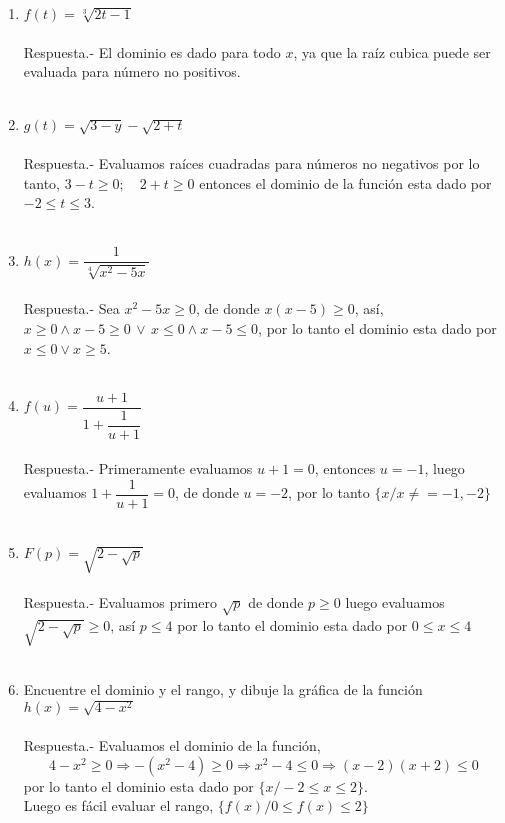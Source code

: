 \begin{enumerate}
    \item $f(t)=\sqrt[3]{2t-1}$ \\\\
	Respuesta.-\: El dominio es dado para todo $x$, ya que la raíz cubica puede ser evaluada para número no positivos.\\\\

    \item $g(t)=\sqrt{3-y}-\sqrt{2+t}$ \\\\
	Respuesta.-\: Evaluamos raíces cuadradas para números no negativos por lo tanto, $3-t\geq 0; \quad 2+t\geq 0$ entonces el dominio de la función esta dado por  $-2\leq t\leq 3$.\\\\

    \item $h(x)=\dfrac{1}{\sqrt[4]{x^2-5x}}$ \\\\
	Respuesta.-\: Sea $x^2-5x \geq 0$, de donde $x(x-5)\geq 0$, así, $x\geq 0 \land x-5\geq 0 \, \lor \, x\leq 0 \land x-5\leq 0$, por lo tanto el dominio esta dado por $x\leq 0 \lor x\geq 5$.\\\\ 

    \item $f(u)=\dfrac{u+1}{1+\dfrac{1}{u+1}}$ \\\\
	Respuesta.-\: Primeramente evaluamos $u+1=0$, entonces $u=-1$, luego evaluamos $1+\dfrac{1}{u+1}=0$, de donde $u=-2$, por lo tanto $\lbrace x/x\neq =-1,-2\rbrace$\\\\

    \item $F(p)=\sqrt{2 - \sqrt{p}}$ \\\\
	Respuesta.-\: Evaluamos primero $\sqrt{p}$ de donde  $p\geq 0$ luego evaluamos $\sqrt{2 - \sqrt{p}}\geq 0$, así $p\leq 4$ por lo tanto el dominio esta dado por $0\leq x \leq 4$\\\\

    \item Encuentre el dominio y el rango, y dibuje la gráfica de la función $h(x)=\sqrt{4-x^2}$\\\\
	Respuesta.-\; Evaluamos el dominio de la función, $$4-x^2 \geq 0 \Rightarrow -(x^2-4) \geq 0 \Rightarrow x^2 -4  \leq 0 \Rightarrow (x-2)(x+2) \leq 0$$ por lo tanto el dominio esta dado por  $\lbrace x / -2 \leq x \leq 2 \rbrace$.\\ 
	Luego es fácil evaluar el rango, $\lbrace f(x) / 0\leq f(x) \leq 2 \rbrace$


\end{enumerate}
